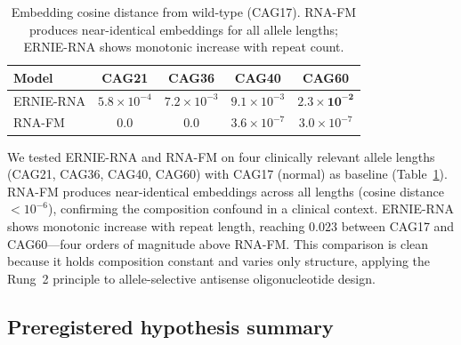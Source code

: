 \documentclass[11pt]{article}
\begin{document}
\begin{table}[htbp]
\centering
\caption{Embedding cosine distance from wild-type (CAG17). RNA-FM
produces near-identical embeddings for all allele lengths; ERNIE-RNA
shows monotonic increase with repeat count.}
\label{tab:htt}
\small
\begin{tabular}{lcccc}
\toprule
\textbf{Model} & \textbf{CAG21} & \textbf{CAG36} & \textbf{CAG40} & \textbf{CAG60} \\
\midrule
ERNIE-RNA & $5.8 \times 10^{-4}$ & $7.2 \times 10^{-3}$ & $9.1 \times 10^{-3}$ & $\mathbf{2.3 \times 10^{-2}}$ \\
RNA-FM    & 0.0 & 0.0 & $3.6 \times 10^{-7}$ & $3.0 \times 10^{-7}$ \\
\bottomrule
\end{tabular}
\end{table}

We tested ERNIE-RNA and RNA-FM on four clinically relevant allele
lengths (CAG21, CAG36, CAG40, CAG60) with CAG17 (normal) as baseline
(Table~\ref{tab:htt}). RNA-FM produces near-identical embeddings
across all lengths (cosine distance $< 10^{-6}$), confirming the
composition confound in a clinical context. ERNIE-RNA shows monotonic
increase with repeat length, reaching $0.023$ between CAG17 and
CAG60---four orders of magnitude above RNA-FM. This comparison is
clean because it holds composition constant and varies only structure,
applying the Rung~2 principle to allele-selective antisense
oligonucleotide design.

\subsection{Preregistered hypothesis summary}
\end{document}
